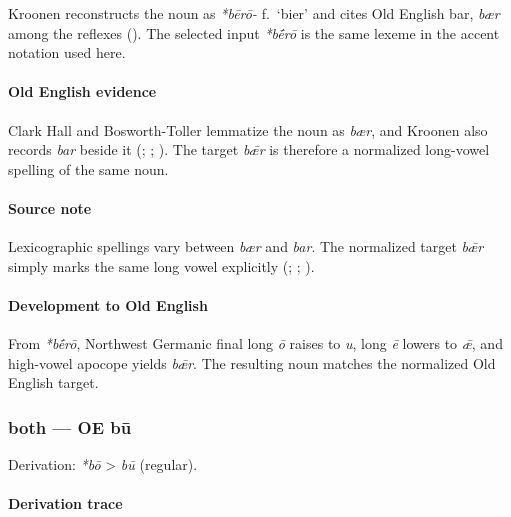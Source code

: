 \documentclass[
  british,
  a4paper,
]{article}
\begin{document}
Kroonen reconstructs the noun as \emph{*bērō-} f.~`bier' and cites Old
English bar, \emph{bær} among the reflexes
(). The selected input
\emph{*bḗrō} is the same lexeme in the accent notation used here.

\paragraph{Old English evidence}\label{old-english-evidence-2}

Clark Hall and Bosworth-Toller lemmatize the noun as \emph{bær}, and
Kroonen also records \emph{bar} beside it
(;
;
). The target \emph{bǣr} is
therefore a normalized long-vowel spelling of the same noun.

\paragraph{Source note}\label{source-note}

Lexicographic spellings vary between \emph{bær} and \emph{bar}. The
normalized target \emph{bǣr} simply marks the same long vowel explicitly
(;
;
).

\paragraph{Development to Old
English}\label{development-to-old-english-2}

From \emph{*bḗrō}, Northwest Germanic final long \emph{ō} raises to
\emph{u}, long \emph{ē} lowers to \emph{ǣ}, and high-vowel apocope
yields \emph{bǣr}. The resulting noun matches the normalized Old English
target.

\subsubsection{both --- OE bū}\label{both-oe-bux16b}

Derivation: \emph{*bō} \textgreater{} \emph{bū} (regular).

\paragraph{Derivation trace}\label{derivation-trace-3}
\end{document}
